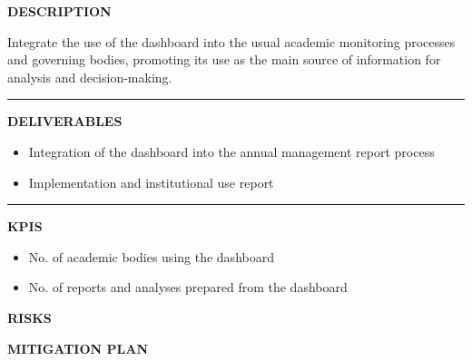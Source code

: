 \documentclass[11pt,a4paper]{scrreprt}
\newcommand{\fieldlabel}[1]{%
  {\footnotesize\sffamily\bfseries\color{mutedcolor}\MakeUppercase{#1}}\par\nopagebreak[4]
}
\newcommand{\fieldsep}{\vspace{3pt}\noindent\textcolor{bordercolor}{\rule{\linewidth}{0.4pt}}\vspace{3pt}\par}
\begin{document}
\begin{tcolorbox}[pabox={dashcolor}{A.P.5.2 \enspace\textbullet\enspace Implementation and Institutional Use of the Dashboard in Management Processes}]

\fieldlabel{Description}
{\small Integrate the use of the dashboard into the usual academic monitoring processes and governing bodies, promoting its use as the main source of information for analysis and decision-making.}\par
\fieldsep
\fieldlabel{Deliverables}
{\small \begin{itemize}[noitemsep,topsep=2pt]
\item Integration of the dashboard into the annual management report process
\item Implementation and institutional use report
\end{itemize}}\par
\fieldsep
\fieldlabel{KPIs}
{\small \begin{itemize}[noitemsep,topsep=2pt]
\item No. of academic bodies using the dashboard
\item No. of reports and analyses prepared from the dashboard
\end{itemize}}\par
\end{tcolorbox}
\begin{tcolorbox}[riskbox]
{\footnotesize\sffamily\bfseries\color{red!50!black} RISKS}\par{}
\end{tcolorbox}
\begin{tcolorbox}[mitbox]
{\footnotesize\sffamily\bfseries\color{green!40!black} MITIGATION PLAN}\par{}
\end{tcolorbox}
\vspace{8pt}
\end{document}
